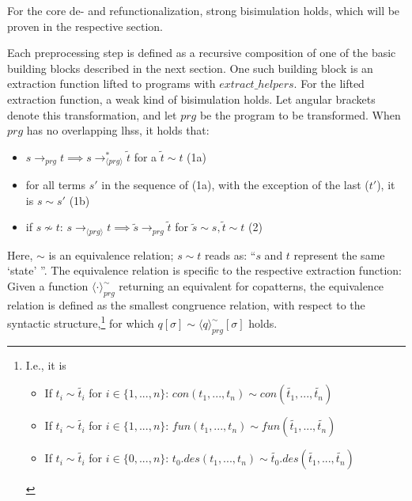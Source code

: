For the core de- and refunctionalization, strong bisimulation holds, which will be proven in the respective section.

Each preprocessing step is defined as a recursive composition of one of the basic building blocks described in the next section. One such building block is an extraction function lifted to programs with $extract\_helpers$. For the lifted extraction function, a weak kind of bisimulation holds. Let angular brackets denote this transformation, and let $prg$ be the program to be transformed. When $prg$ has no overlapping lhss, it holds that:

\begin{itemize}
\item $s \longrightarrow_{prg} t \implies s  \longrightarrow^*_{\langle prg \rangle} \tilde{t}$ for a $\tilde{t} \sim t$ (1a)

\item for all terms $s'$ in the sequence of (1a), with the exception of the last ($t'$), it is $s \sim s'$ (1b)

\item if $s \not\sim t$: $s \longrightarrow_{\langle prg \rangle} t \implies \tilde{s} \longrightarrow_{prg} \tilde{t}$ for $\tilde{s} \sim s, \tilde{t} \sim t$ (2)

\end{itemize}

Here, $\sim$ is an equivalence relation; $s \sim t$ reads as: ``$s$ and $t$ represent the same `state' ''. The equivalence relation is specific to the respective extraction function: Given a function $\langle \cdot \rangle^{\sim}_{prg}$ returning an equivalent for copatterns, the equivalence relation is defined as the smallest congruence relation, with respect to the syntactic structure,\footnote{I.e., it is
\begin{itemize}

\item If $t_i \sim \widetilde{t_i}$ for $i \in \{1, ..., n\}$: $con(t_1, ..., t_n) \sim con(\widetilde{t_1}, ..., \widetilde{t_n})$

\item If $t_i \sim \widetilde{t_i}$ for $i \in \{1, ..., n\}$: $fun(t_1, ..., t_n) \sim fun(\widetilde{t_1}, ..., \widetilde{t_n})$

\item If $t_i \sim \widetilde{t_i}$ for $i \in \{0, ..., n\}$: $t_0.des(t_1, ..., t_n) \sim \widetilde{t_0}.des(\widetilde{t_1}, ..., \widetilde{t_n})$ 

\end{itemize}} for which $q[\sigma] \sim \langle q \rangle^{\sim}_{prg}[\sigma]$ holds.

